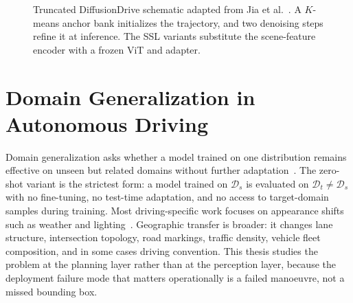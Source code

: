 \begin{figure}[ht]
    \centering
    \caption[DiffusionDrive schematic.]{Truncated DiffusionDrive schematic adapted from Jia et al.~\cite{jia-diffusiondrive-2025}. A $K$-means anchor bank initializes the trajectory, and two denoising steps refine it at inference. The SSL variants substitute the scene-feature encoder with a frozen ViT and adapter.}
    \label{fig:bg-diffusiondrive}
\end{figure}

\section{Domain Generalization in Autonomous Driving}
\label{sec:bg-domain-gen}

Domain generalization asks whether a model trained on one distribution remains effective on unseen but related domains without further adaptation~\cite{wang-domain-gen-survey-2022,zhou-domain-gen-survey-2023}. The zero-shot variant is the strictest form: a model trained on $\mathcal{D}_s$ is evaluated on $\mathcal{D}_t \neq \mathcal{D}_s$ with no fine-tuning, no test-time adaptation, and no access to target-domain samples during training. Most driving-specific work focuses on appearance shifts such as weather and lighting~\cite{sakaridis-acdc-2021,pan-cycada-2018,dosovitskiy-carla-2017}. Geographic transfer is broader: it changes lane structure, intersection topology, road markings, traffic density, vehicle fleet composition, and in some cases driving convention. This thesis studies the problem at the planning layer rather than at the perception layer, because the deployment failure mode that matters operationally is a failed manoeuvre, not a missed bounding box.
